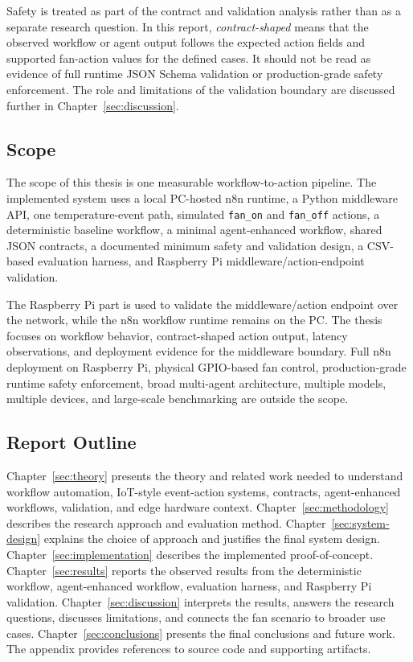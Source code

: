 Safety is treated as part of the contract and validation analysis rather than as a separate research question. In this report, \emph{contract-shaped} means that the observed workflow or agent output follows the expected action fields and supported fan-action values for the defined cases. It should not be read as evidence of full runtime JSON Schema validation or production-grade safety enforcement. The role and limitations of the validation boundary are discussed further in Chapter~\ref{sec:discussion}.

\subsection{Scope}\label{subsec:scope-limitations}

The scope of this thesis is one measurable workflow-to-action pipeline. The implemented system uses a local PC-hosted n8n runtime, a Python middleware API, one temperature-event path, simulated \texttt{fan\_on} and \texttt{fan\_off} actions, a deterministic baseline workflow, a minimal agent-enhanced workflow, shared JSON contracts, a documented minimum safety and validation design, a CSV-based evaluation harness, and Raspberry Pi middleware/action-endpoint validation.

The Raspberry Pi part is used to validate the middleware/action endpoint over the network, while the n8n workflow runtime remains on the PC. The thesis focuses on workflow behavior, contract-shaped action output, latency observations, and deployment evidence for the middleware boundary. Full n8n deployment on Raspberry Pi, physical GPIO-based fan control, production-grade runtime safety enforcement, broad multi-agent architecture, multiple models, multiple devices, and large-scale benchmarking are outside the scope.







\subsection{Report Outline}\label{subsec:outline}

Chapter~\ref{sec:theory} presents the theory and related work needed to understand workflow automation, IoT-style event-action systems, contracts, agent-enhanced workflows, validation, and edge hardware context. Chapter~\ref{sec:methodology} describes the research approach and evaluation method. Chapter~\ref{sec:system-design} explains the choice of approach and justifies the final system design. Chapter~\ref{sec:implementation} describes the implemented proof-of-concept. Chapter~\ref{sec:results} reports the observed results from the deterministic workflow, agent-enhanced workflow, evaluation harness, and Raspberry Pi validation. Chapter~\ref{sec:discussion} interprets the results, answers the research questions, discusses limitations, and connects the fan scenario to broader use cases. Chapter~\ref{sec:conclusions} presents the final conclusions and future work. The appendix provides references to source code and supporting artifacts.

